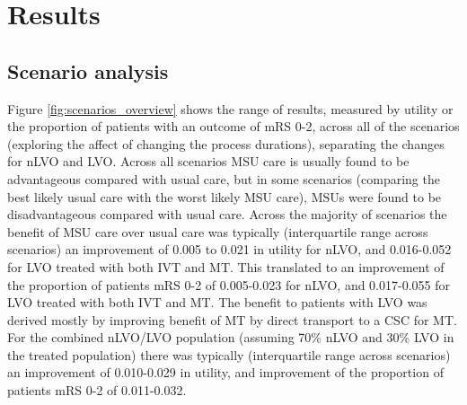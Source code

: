 \section{Results}

\subsection{Scenario analysis}

Figure \ref{fig:scenarios_overview} shows the range of results, measured by utility or the proportion of patients with an outcome of mRS 0-2, across all of the scenarios (exploring the affect of changing the process durations), separating the changes for nLVO and LVO. Across all scenarios MSU care is usually found to be advantageous compared with usual care, but in some scenarios (comparing the best likely usual care with the worst likely MSU care), MSUs were found to be disadvantageous compared with usual care. Across the majority of scenarios the benefit of MSU care over usual care was typically (interquartile range across scenarios) an improvement of 0.005 to 0.021 in utility for nLVO, and 0.016-0.052 for LVO treated with both IVT and MT. This translated to an improvement of the proportion of patients mRS 0-2 of 0.005-0.023 for nLVO, and 0.017-0.055 for LVO treated with both IVT and MT. The benefit to patients with LVO was derived mostly by improving benefit of MT by direct transport to a CSC for MT. For the combined nLVO/LVO population (assuming 70\% nLVO and 30\% LVO in the treated population) there was typically (interquartile range across scenarios) an improvement of 0.010-0.029 in utility, and improvement of the proportion of patients mRS 0-2 of 0.011-0.032.


